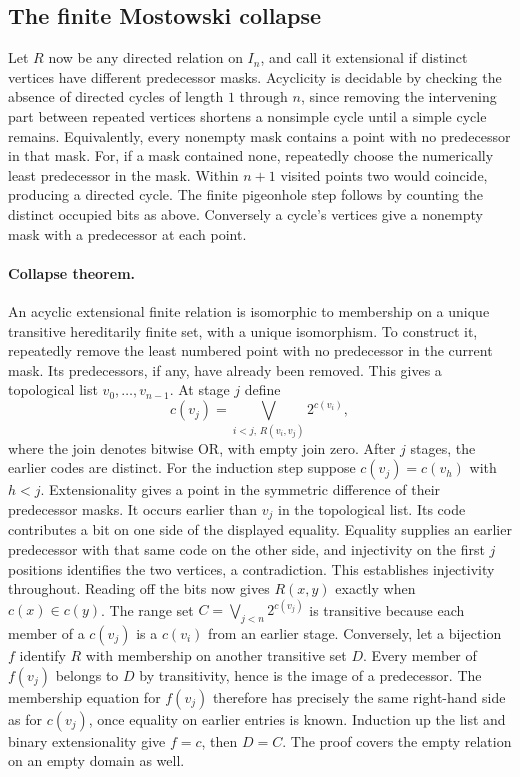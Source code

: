 \subsection{The finite Mostowski collapse}

Let $R$ now be any directed relation on $I_n$, and call it extensional
if distinct vertices have different predecessor masks. Acyclicity is
decidable by checking the absence of directed cycles of length $1$
through $n$, since removing the intervening part between repeated
vertices shortens a nonsimple cycle until a simple cycle remains.
Equivalently, every nonempty mask contains a point with no predecessor
in that mask. For, if a mask contained none, repeatedly choose the
numerically least predecessor in the mask. Within $n+1$ visited points
two would coincide, producing a directed cycle. The finite pigeonhole
step follows by counting the distinct occupied bits as above.
Conversely a cycle's vertices give a nonempty mask with a predecessor
at each point.

\paragraph{Collapse theorem.}
An acyclic extensional finite relation is isomorphic to membership on
a unique transitive hereditarily finite set, with a unique isomorphism.
To construct it, repeatedly remove the least numbered point with no
predecessor in the current mask. Its predecessors, if any, have already
been removed. This gives a topological list $v_0,\ldots,v_{n-1}$. At
stage $j$ define
\[
                  c(v_j)=\bigvee_{i<j,\,R(v_i,v_j)} 2^{c(v_i)},
\]
where the join denotes bitwise OR, with empty join zero. After $j$
stages, the earlier codes are distinct. For the induction step suppose
$c(v_j)=c(v_h)$ with $h<j$. Extensionality gives a point in the
symmetric difference of their predecessor masks. It occurs earlier
than $v_j$ in the topological list. Its code contributes a bit on one
side of the displayed equality. Equality supplies an earlier
predecessor with that same code on the other side, and injectivity on
the first $j$ positions identifies the two vertices, a contradiction.
This establishes injectivity throughout. Reading off the bits now gives
$R(x,y)$ exactly when $c(x)\in c(y)$. The range set
$C=\bigvee_{j<n}2^{c(v_j)}$ is transitive because each member of a
$c(v_j)$ is a $c(v_i)$ from an earlier stage. Conversely, let a
bijection $f$ identify $R$ with membership on another transitive
set $D$. Every member of $f(v_j)$ belongs to $D$ by transitivity,
hence is the image of a predecessor. The membership equation for
$f(v_j)$ therefore has precisely the same right-hand side as for
$c(v_j)$, once equality on earlier entries is known. Induction up the
list and binary extensionality give $f=c$, then $D=C$. The proof covers
the empty relation on an empty domain as well.

